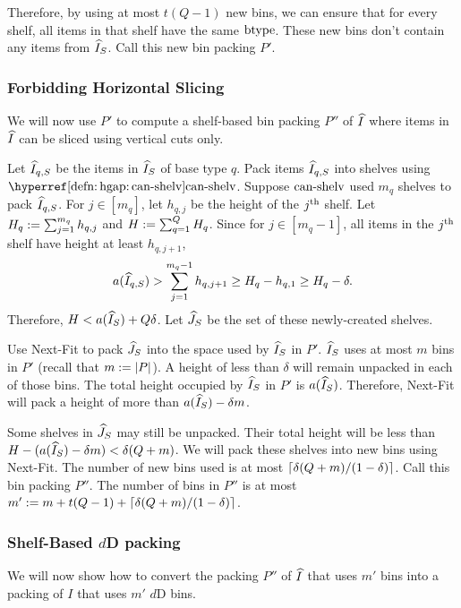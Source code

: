 Therefore, by using at most $t(Q-1)$ new bins,
we can ensure that for every shelf,
all items in that shelf have the same $\operatorname{btype}$.
These new bins don't contain any items from $\widehat{I}_S$.
Call this new bin packing $P'$.

\subsubsection{Forbidding Horizontal Slicing}
\label{sec:hgap:forbid-hslice}

We will now use $P'$ to compute a shelf-based bin packing $P''$ of $\widehat{I}$ where
items in $\widehat{I}$ can be sliced using vertical cuts only.

Let $\widehat{I}_{q,S}$ be the items in $\widehat{I}_S$ of base type $q$.
Pack items $\widehat{I}_{q,S}$ into shelves using $\canShelvHyp$.
Suppose $\operatorname{can-shelv}$ used $m_q$ shelves to pack $\widehat{I}_{q,S}$.
For $j \in [m_q]$, let $h_{q,j}$ be the height of the $j^{\textrm{th}}$ shelf.
Let $H_q := \sum_{j=1}^{m_q} h_{q,j}$ and $H := \sum_{q=1}^Q H_q$.
Since for $j \in [m_q-1]$, all items in the $j^{\textrm{th}}$ shelf have height at least $h_{q,j+1}$,
\[ a(\widehat{I}_{q,S}) > \sum_{j=1}^{m_q-1} h_{q,j+1} \ge H_q - h_{q,1} \ge H_q - \delta. \]
Therefore, $H < a(\widehat{I}_S) + Q\delta$.
Let $\widehat{J}_S$ be the set of these newly-created shelves.

Use Next-Fit to pack $\widehat{J}_S$ into the space used by $\widehat{I}_S$ in $P'$.
$\widehat{I}_S$ uses at most $m$ bins in $P'$ (recall that $m := |P|$).
A height of less than $\delta$ will remain unpacked in each of those bins.
The total height occupied by $\widehat{I}_S$ in $P'$ is $a(\widehat{I}_S)$.
Therefore, Next-Fit will pack a height of more than $a(\widehat{I}_S) - \delta m$.

Some shelves in $\widehat{J}_S$ may still be unpacked.
Their total height will be less than
$H - (a(\widehat{I}_S) - \delta m) < \delta(Q + m)$.
We will pack these shelves into new bins using Next-Fit.
The number of new bins used is at most $\left\lceil \delta(Q + m)/(1-\delta) \right\rceil$.
Call this bin packing $P''$. The number of bins in $P''$
is at most $m' := m + t(Q-1) + \left\lceil \delta(Q+m)/(1-\delta) \right\rceil$.

\subsubsection{Shelf-Based \texorpdfstring{$d$}{d}D packing}
\label{sec:hgap:2d-to-dd}

We will now show how to convert the packing $P''$ of $\widehat{I}$ that uses $m'$ bins
into a packing of $I$ that uses $m'$ $d$D bins.


